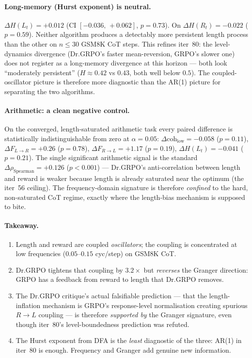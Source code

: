 \paragraph{Long-memory (Hurst exponent) is neutral.}
$\Delta H(L_t)=+0.012$ (CI $[-0.036,\,+0.062]$, $p=0.73$). On
$\Delta H(R_t)=-0.022$ ($p=0.59$). Neither algorithm produces a
detectably more persistent length process than the other on
$n\le 30$ GSM8K CoT steps. This refines iter~80: the level-dynamics
divergence (Dr.GRPO's faster mean-reversion, GRPO's slower one) does not
register as a long-memory divergence at this horizon --- both look
``moderately persistent'' ($H\approx 0.42$ vs $0.43$, both well below
$0.5$). The coupled-oscillator picture is therefore more diagnostic
than the AR(1) picture for separating the two algorithms.

\paragraph{Arithmetic: a clean negative control.}
On the converged, length-saturated arithmetic task every paired
difference is statistically indistinguishable from zero at $\alpha=0.05$:
$\Delta\mathrm{coh}_{\mathrm{low}}=-0.058$ ($p=0.11$), $\Delta F_{L\to R}=+0.26$
($p=0.78$), $\Delta F_{R\to L}=+1.17$ ($p=0.19$), $\Delta H(L_t)=-0.041$
($p=0.21$). The single significant arithmetic signal is the standard
$\Delta\rho_{\mathrm{Spearman}}=+0.126$ ($p<0.001$) --- Dr.GRPO's anti-correlation
between length and reward is weaker because length is already saturated near
the optimum (the iter~56 ceiling). The frequency-domain signature is therefore
\emph{confined} to the hard, non-saturated CoT regime, exactly where the
length-bias mechanism is supposed to bite.

\paragraph{Takeaway.}
\begin{enumerate}\item Length and reward are coupled \emph{oscillators}; the
coupling is concentrated at low frequencies ($0.05$--$0.15$ cyc/step)
on GSM8K CoT.\item Dr.GRPO tightens that coupling by $3.2\times$ but
\emph{reverses} the Granger direction: GRPO has a feedback from reward
to length that Dr.GRPO removes.\item The Dr.GRPO critique's actual
falsifiable prediction --- that the length-inflation mechanism is
GRPO's response-level normalisation creating spurious $R\to L$ coupling
--- is therefore \emph{supported by} the Granger signature, even though
iter~80's level-boundedness prediction was refuted.\item The Hurst
exponent from DFA is the \emph{least} diagnostic of the three: AR(1)
in iter~80 is enough. Frequency and Granger add genuine new
information.
\end{enumerate}

